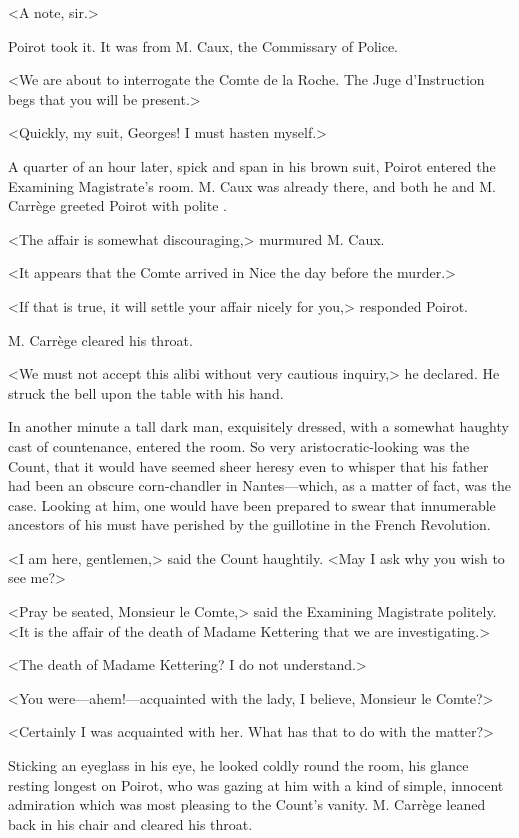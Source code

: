 <A note, sir.>

Poirot took it. It was from M. Caux, the Commissary of Police.

<We are about to interrogate the Comte de la Roche. The Juge d'Instruction begs that you will be present.>

<Quickly, my suit, Georges! I must hasten myself.>

A quarter of an hour later, spick and span in his brown suit, Poirot entered the Examining Magistrate's room. M. Caux was already there, and both he and M. Carrège greeted Poirot with polite .

<The affair is somewhat discouraging,> murmured M. Caux.

<It appears that the Comte arrived in Nice the day before the murder.>

<If that is true, it will settle your affair nicely for you,> responded Poirot.

M. Carrège cleared his throat.

<We must not accept this alibi without very cautious inquiry,> he declared. He struck the bell upon the table with his hand.

In another minute a tall dark man, exquisitely dressed, with a somewhat haughty cast of countenance, entered the room. So very aristocratic-looking was the Count, that it would have seemed sheer heresy even to whisper that his father had been an obscure corn-chandler in Nantes—which, as a matter of fact, was the case. Looking at him, one would have been prepared to swear that innumerable ancestors of his must have perished by the guillotine in the French Revolution.

<I am here, gentlemen,> said the Count haughtily. <May I ask why you wish to see me?>

<Pray be seated, Monsieur le Comte,> said the Examining Magistrate politely. <It is the affair of the death of Madame Kettering that we are investigating.>

<The death of Madame Kettering? I do not understand.>

<You were—ahem!—acquainted with the lady, I believe, Monsieur le Comte?>

<Certainly I was acquainted with her. What has that to do with the matter?>

Sticking an eyeglass in his eye, he looked coldly round the room, his glance resting longest on Poirot, who was gazing at him with a kind of simple, innocent admiration which was most pleasing to the Count's vanity. M. Carrège leaned back in his chair and cleared his throat.

